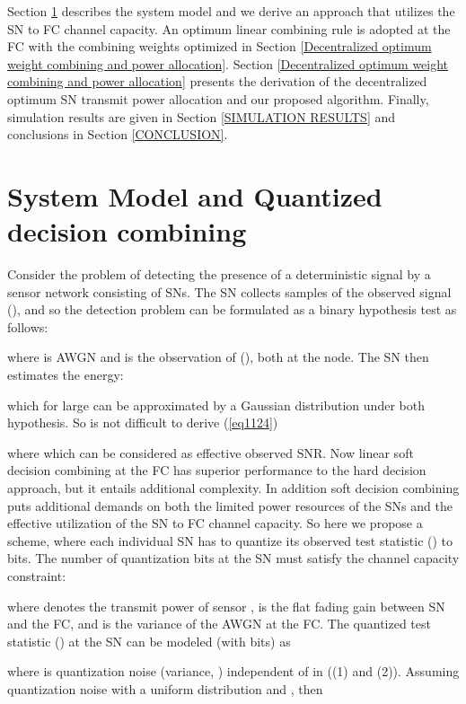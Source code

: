 \documentclass[conference]{IEEEtran}
\begin{document}
\indent Section \ref{sec:format} describes the system model and we derive an approach that utilizes the SN to FC channel capacity. An optimum linear combining rule is adopted at the FC with the combining weights optimized in Section \ref{Decentralized optimum weight combining and power allocation}. Section \ref{Decentralized optimum weight combining and power allocation} presents the derivation of the decentralized optimum SN transmit power allocation and our proposed algorithm. Finally, simulation results are given in Section \ref{SIMULATION RESULTS} and conclusions in Section \ref{CONCLUSION}.
\section{System Model and Quantized decision combining}
\label{sec:format}
Consider the problem of detecting the presence of a deterministic signal  by a sensor network consisting of  SNs. The  SN collects  samples of the observed signal (), and so the detection problem can be formulated as a binary hypothesis test as follows: 

where  is AWGN and  is the observation of (), both at the  node. The  SN then estimates the energy:

which for large  can be approximated by a Gaussian distribution \cite{les98} under both hypothesis. So is not difficult to derive (\ref{eq1124})
\begin{figure*}[h!tb]
\normalsize

\hrulefill
\vspace*{-12pt}
\end{figure*}
where  which can be considered as effective observed SNR. Now linear soft decision combining at the FC has superior performance to the hard decision approach, but it entails additional complexity. In addition soft decision combining puts additional demands on both the limited power resources of the SNs and the effective utilization of the SN to FC channel capacity. So here we propose a scheme, where each individual SN has to quantize its observed test statistic () to  bits. The number of quantization bits at the  SN must satisfy the channel capacity constraint:

where  denotes the transmit power of sensor ,  is the flat fading gain between SN  and the FC, and  is the  variance of the AWGN at the FC.
The quantized test statistic () at the  SN can be modeled (with  bits) as 

where  is quantization noise (variance, ) independent of  in ((1) and (2)). Assuming quantization noise with a uniform distribution and , then
\end{document}
